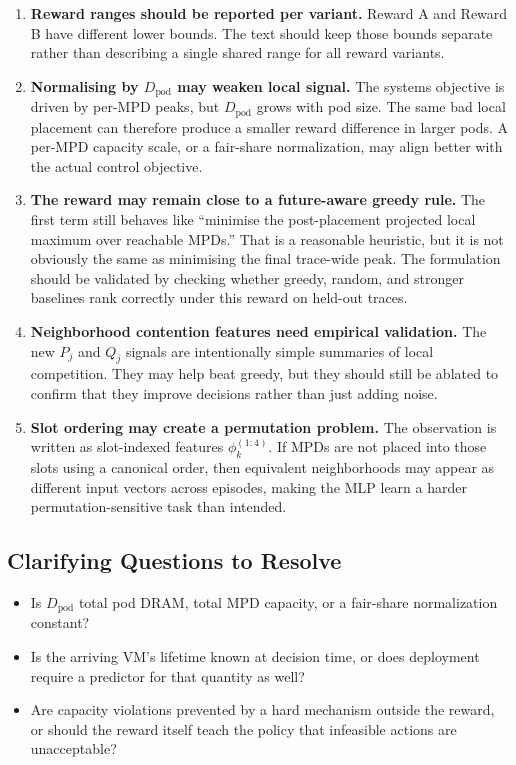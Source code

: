 \documentclass[11pt]{article}
\begin{document}
\begin{enumerate}
    \item \textbf{Reward ranges should be reported per variant.}
    Reward A and Reward B have different lower bounds.  The text should
    keep those bounds separate rather than describing a single shared
    range for all reward variants.

    \item \textbf{Normalising by $D_\mathrm{pod}$ may weaken local signal.}
    The systems objective is driven by per-MPD peaks, but
    $D_\mathrm{pod}$ grows with pod size.  The same bad local placement
    can therefore produce a smaller reward difference in larger pods.
    A per-MPD capacity scale, or a fair-share normalization, may align
    better with the actual control objective.

    \item \textbf{The reward may remain close to a future-aware greedy rule.}
    The first term still behaves like ``minimise the post-placement
    projected local maximum over reachable MPDs.''  That is a reasonable
    heuristic, but it is not obviously the same as minimising the final
    trace-wide peak.  The formulation should be validated by checking
    whether greedy, random, and stronger baselines rank correctly under
    this reward on held-out traces.

    \item \textbf{Neighborhood contention features need empirical validation.}
    The new $P_j$ and $Q_j$ signals are intentionally simple summaries of
    local competition.  They may help beat greedy, but they should still
    be ablated to confirm that they improve decisions rather than just
    adding noise.

    \item \textbf{Slot ordering may create a permutation problem.}
    The observation is written as slot-indexed features
    $\phi_k^{(1:4)}$.  If MPDs are not placed into those slots using a
    canonical order, then equivalent neighborhoods may appear as
    different input vectors across episodes, making the MLP learn a
    harder permutation-sensitive task than intended.
\end{enumerate}

\subsection{Clarifying Questions to Resolve}

\begin{itemize}
    \item Is $D_\mathrm{pod}$ total pod DRAM, total MPD capacity, or a
    fair-share normalization constant?
    \item Is the arriving VM's lifetime known at decision time, or does
    deployment require a predictor for that quantity as well?
    \item Are capacity violations prevented by a hard mechanism outside
    the reward, or should the reward itself teach the policy that
    infeasible actions are unacceptable?
\end{itemize}
\end{document}
